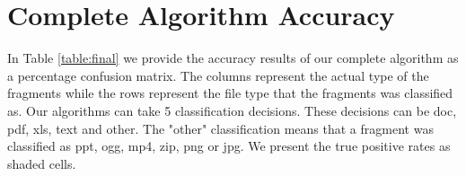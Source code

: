 

\section{Complete Algorithm Accuracy}\label{sec:6.3}
In Table \ref{table:final} we provide the accuracy results of our complete algorithm as a percentage confusion matrix. The columns represent the actual type of the fragments while the rows represent the file type that the fragments was classified as. Our algorithms can take 5 classification decisions. These decisions can be doc, pdf, xls, text and other. The "other" classification means that a fragment was classified as ppt, ogg, mp4, zip, png or jpg.  We present the true positive rates as shaded cells.

